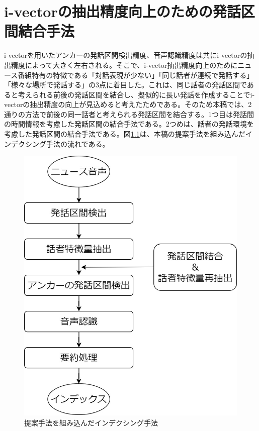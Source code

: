 \chapter{i-vectorの抽出精度向上のための発話区間結合手法}
\label{chapter:prob_method}
i-vectorを用いたアンカーの発話区間検出精度、音声認識精度は共にi-vectorの抽出精度によって大きく左右される。そこで、i-vector抽出精度向上のためにニュース番組特有の特徴である「対話表現が少ない」「同じ話者が連続で発話する」「様々な場所で発話する」の3点に着目した。これは、同じ話者の発話区間であると考えられる前後の発話区間を結合し、擬似的に長い発話を作成することでi-vectorの抽出精度の向上が見込めると考えたためである。そのため本稿では、2通りの方法で前後の同一話者と考えられる発話区間を結合する。1つ目は発話間の時間情報を考慮した発話区間の結合手法である。2つめは、話者の発話環境を考慮した発話区間の結合手法である。図\ref{fig:indexing2}は、本稿の提案手法を組み込んだインデクシング手法の流れである。

\begin{figure}[H]
  \begin{center}
    \includegraphics[scale=0.3]{./figure/indexing2.eps}
  \end{center}
  \caption{提案手法を組み込んだインデクシング手法 \label{fig:indexing2}}
\end{figure}

